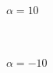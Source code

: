 \documentclass{article}
\begin{document}
\begin{figure}[h!]
\caption*{$ \alpha = 10 $}
\end{figure}\\
\begin{figure}[h!]
\caption*{$ \alpha = -10 $}
\end{figure}\\
\end{document}
